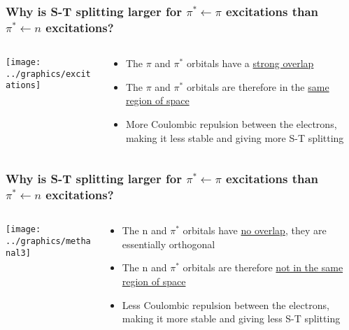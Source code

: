 \documentclass[a4paper,12pt,titlepage]{article}
\begin{document}
\begin{frame}
\frametitle{Why is S-T splitting larger for \(\pi^* \leftarrow \pi\) excitations than \(\pi^* \leftarrow n\) excitations?}
\begin{columns}[onlytextwidth]
\begin{column}{.5\textwidth}
\texttt{[image: ../graphics/excitations]}
\end{column}
\begin{column}{.5\textwidth}
\begin{itemize}
\item The \(\pi\) and \(\pi^*\) orbitals have a \underline{strong overlap}
\item The \(\pi\) and \(\pi^*\) orbitals are therefore in the \underline{same region of space}
\item \hspace{5pt} More Coulombic repulsion between the electrons, making it less stable and giving more S-T splitting
\end{itemize}
\end{column}
\end{columns}
\end{frame}

\begin{frame}
\frametitle{Why is S-T splitting larger for \(\pi^* \leftarrow \pi\) excitations than \(\pi^* \leftarrow n\) excitations?}
\begin{columns}[onlytextwidth]
\begin{column}{.5\textwidth}
\texttt{[image: ../graphics/methanal3]}
\end{column}
\begin{column}{.5\textwidth}
\begin{itemize}
\item The n and \(\pi^*\) orbitals have \underline{no overlap}, they are essentially orthogonal
\item The n and \(\pi^*\) orbitals are therefore \underline{not in the same region of space}
\item \hspace{5pt} Less Coulombic repulsion between the electrons, making it more stable and giving less S-T splitting
\end{itemize}
\end{column}
\end{columns}
\end{frame}
\end{document}
